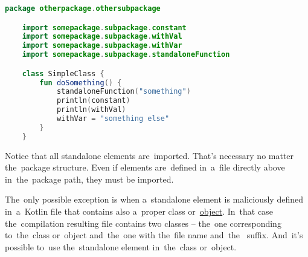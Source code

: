 \begin{lstlisting}[language=Kotlin, title={Usage}]
    package otherpackage.othersubpackage

    import somepackage.subpackage.constant
    import somepackage.subpackage.withVal
    import somepackage.subpackage.withVar
    import somepackage.subpackage.standaloneFunction

    class SimpleClass {
        fun doSomething() {
            standaloneFunction("something")
            println(constant)
            println(withVal)
            withVar = "something else"
        }
    }
\end{lstlisting}
\noindent Notice that all standalone elements are~imported.
That's necessary no matter the~package structure.
Even if elements are~defined in~a~file directly above in~the~package path, they must be imported.

The~only possible exception is when a~standalone element is maliciously defined in~a~Kotlin file that contains also a~proper class or~\hyperref[kotlinobject]{object}.
In~that case the~compilation resulting  file contains two classes -- the~one corresponding to~the~class or~object and~the~one with the~file name \mbox{and the } suffix.
And~it's possible to~use the~standalone element in~the~class or~object.
